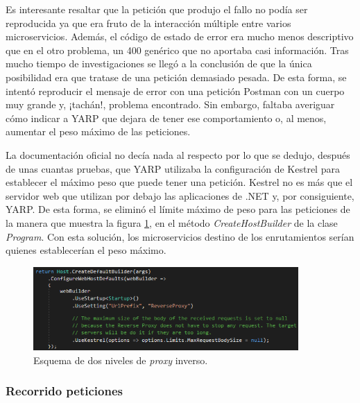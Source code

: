 \documentclass[11pt,spanish,listoffigures]{tfgetsinf}
\begin{document}
Es interesante resaltar que la petición que produjo el fallo no podía ser reproducida ya que era fruto de la interacción múltiple entre varios microservicios. Además, el código de estado de error era mucho menos descriptivo que en el otro problema, un 400 genérico que no aportaba casi información. Tras mucho tiempo de investigaciones se llegó a la conclusión de que la única posibilidad era que tratase de una petición demasiado pesada. De esta forma, se intentó reproducir el mensaje de error con una petición Postman con un cuerpo muy grande y, ¡tachán!, problema encontrado. Sin embargo, faltaba averiguar cómo indicar a YARP que dejara de tener ese comportamiento o, al menos, aumentar el peso máximo de las peticiones.

La documentación oficial no decía nada al respecto por lo que se dedujo, después de unas cuantas pruebas, que YARP utilizaba la configuración de Kestrel \cite{Kestrel} para establecer el máximo peso que puede tener una petición. Kestrel no es más que el servidor web que utilizan por debajo las aplicaciones de .NET y, por consiguiente, YARP. De esta forma, se eliminó el límite máximo de peso para las peticiones de la manera que muestra la figura \ref{configuracionKestrel}, en el método \emph{CreateHostBuilder} de la clase \emph{Program}. Con esta solución, los microservicios destino de los enrutamientos serían quienes establecerían el peso máximo.

\begin{figure}[ht]
\centering
\includegraphics[width=0.9\textwidth]{imagenes/configuracionKestrel}
\caption{Esquema de dos niveles de \emph{proxy} inverso.}
	\label{configuracionKestrel}
\end{figure}


			\subsubsection{Recorrido peticiones}
\end{document}
